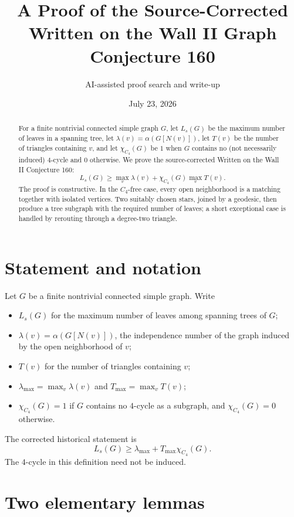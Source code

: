 \documentclass[11pt]{article}
\title{A Proof of the Source-Corrected\\Written on the Wall II Graph Conjecture 160}
\author{AI-assisted proof search and write-up}
\date{July 23, 2026}
\newcommand{\Ls}{L_s}
\newcommand{\lmax}{\lambda_{\max}}
\newcommand{\tmax}{T_{\max}}
\begin{document}
\maketitle

\begin{abstract}
For a finite nontrivial connected simple graph $G$, let $\Ls(G)$ be the
maximum number of leaves in a spanning tree, let
$\lambda(v)=\alpha(G[N(v)])$, let $T(v)$ be the number of triangles
containing $v$, and let $\chi_{C_4}(G)$ be $1$ when $G$ contains no
(not necessarily induced) $4$-cycle and $0$ otherwise.  We prove the
source-corrected Written on the Wall II Conjecture 160:
\[
  \Ls(G)\ge \max_v\lambda(v)+\chi_{C_4}(G)\max_v T(v).
\]
The proof is constructive.  In the $C_4$-free case, every open
neighborhood is a matching together with isolated vertices.  Two
suitably chosen stars, joined by a geodesic, then produce a tree
subgraph with the required number of leaves; a short exceptional case
is handled by rerouting through a degree-two triangle.
\end{abstract}

\section{Statement and notation}

Let $G$ be a finite nontrivial connected simple graph.  Write
\begin{itemize}[leftmargin=2em]
  \item $\Ls(G)$ for the maximum number of leaves among spanning trees of $G$;
  \item $\lambda(v)=\alpha(G[N(v)])$, the independence number of the graph
        induced by the open neighborhood of $v$;
  \item $T(v)$ for the number of triangles containing $v$;
  \item $\lmax=\max_v\lambda(v)$ and $\tmax=\max_vT(v)$;
  \item $\chi_{C_4}(G)=1$ if $G$ contains no $4$-cycle as a subgraph,
        and $\chi_{C_4}(G)=0$ otherwise.
\end{itemize}
The corrected historical statement is
\begin{equation}\label{eq:main}
  \Ls(G)\ge \lmax+\tmax\chi_{C_4}(G).
\end{equation}
The $4$-cycle in this definition need not be induced.

\section{Two elementary lemmas}
\end{document}
